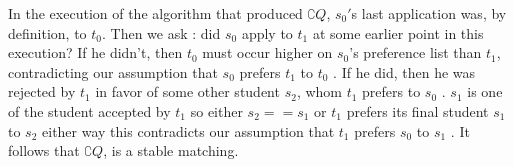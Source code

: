 \documentclass[10 pt]{article}
\begin{document}
In the execution of the algorithm that produced $\complement{Q} $,  $s_0'$s last application was, by definition, to  $t_0$. Then we ask : did $s_0$ apply to $t_1$ at some earlier point in this execution? If he didn’t, then $t_0$  must occur higher on $s_0$'s preference list than $t_1$, contradicting our assumption that $s_0$ prefers $t_1$ to $t_0$ . If he did, then he was rejected by $t_1$  in favor of some other student $s_2$, whom $t_1$ prefers to $s_0$ . $s_1$ is one of the student accepted by  $t_1$  so either $s_2 == s_1$ or  $t_1$ prefers its  final student  $s_1$ to $s_2$  either way this contradicts our assumption that $t_1$  prefers $s_0$ to $s_1$ .
It follows that $\complement{Q} $, is a stable matching.
\end{document}
